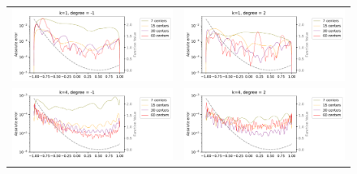 \documentclass[12pt]{report} %
\begin{document}


\begin{figure}
  \hspace*{-2.5cm}
  \begin{tabular}{cc}
    \includegraphics[width=.6\textwidth,clip=true,trim={0 0 3.5cm 0}]{imagenes/experiments/1d/statistical_1d_full_scheduler_interpolation/u2_AVG_1_-1.pdf} &  \includegraphics[width=.6\textwidth,clip=true,trim={0 0 3.5cm 0}]{imagenes/experiments/1d/statistical_1d_full_scheduler_interpolation/u2_AVG_1_2.pdf}  \\
    \includegraphics[width=.6\textwidth,clip=true,trim={0 0 3.5cm 0}]{imagenes/experiments/1d/statistical_1d_full_scheduler_interpolation/u2_AVG_4_-1.pdf} & \includegraphics[width=.6\textwidth,clip=true,trim={0 0 3.5cm 0}]{imagenes/experiments/1d/statistical_1d_full_scheduler_interpolation/u2_AVG_4_2.pdf} \\

\end{tabular}
\end{figure}
\end{document}

